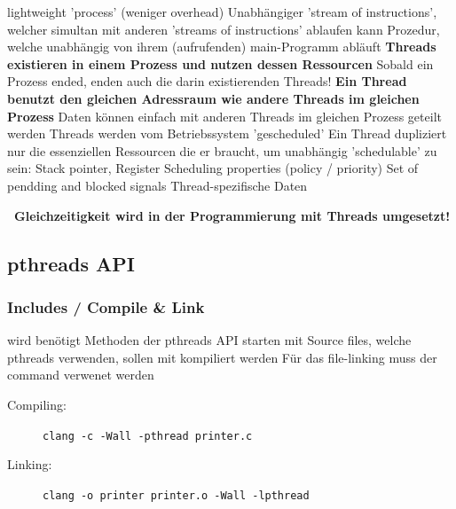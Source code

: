 \begin{outline}
    \1 lightweight 'process' (weniger overhead)
    \1 Unabhängiger 'stream of instructions', welcher simultan mit anderen 'streams of instructions' ablaufen kann %
    \1 Prozedur, welche unabhängig von ihrem (aufrufenden) main-Programm abläuft
    \1 \textbf{Threads existieren in einem Prozess und nutzen dessen Ressourcen}
        \2 Sobald ein Prozess ended, enden auch die darin existierenden Threads!
    \1 \textbf{Ein Thread benutzt den gleichen Adressraum wie andere Threads im gleichen Prozess}
        \2 Daten können einfach mit anderen Threads im gleichen Prozess geteilt werden
    \1 Threads werden vom Betriebssystem 'gescheduled'
    \1 Ein Thread dupliziert nur die essenziellen Ressourcen die er braucht, um unabhängig 'schedulable' zu sein:
        \2 Stack pointer, Register
        \2 Scheduling properties (policy / priority)
        \2 Set of pendding and blocked signals  %
        \2 Thread-spezifische Daten
\end{outline}

\vspace{0.1cm}

\textbf{ \textrightarrow\ Gleichzeitigkeit wird in der Programmierung mit Threads umgesetzt!}


\subsection{pthreads API}

\subsubsection{Includes / Compile \& Link}

\begin{outline}
    \1  wird benötigt
    \1 Methoden der pthreads API starten mit 
    \1 Source files, welche pthreads verwenden, sollen mit  kompiliert werden
    \1 Für das file-linking muss der command  verwenet werden
\end{outline}



\begin{description}
    \item[Compiling:] \lstinline|clang -c -Wall -pthread printer.c|
    \item[Linking:]   \lstinline|clang -o printer printer.o -Wall -lpthread|
\end{description}


